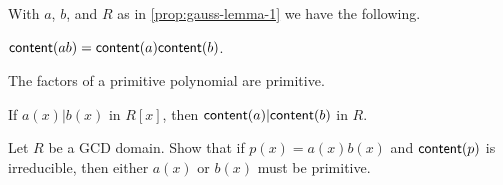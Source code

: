 \begin{cor}
With \(a\), \(b\), and \(R\) as in \ref{prop:gauss-lemma-1} we have the following.
\begin{proplist}
\item \(\mathsf{content}(ab) = \mathsf{content}(a)\mathsf{content}(b)\).
\item The factors of a primitive polynomial are primitive.
\item If \(a(x)|b(x)\) in \(R[x]\), then \(\mathsf{content}(a)|\mathsf{content}(b)\) in \(R\).
\end{proplist}
\end{cor}



\Exercises%

\begin{exercise}
Let \(R\) be a GCD domain.
Show that if \(p(x) = a(x)b(x)\) and \(\mathsf{content}(p)\) is irreducible, then either \(a(x)\) or \(b(x)\) must be primitive.
\end{exercise}

